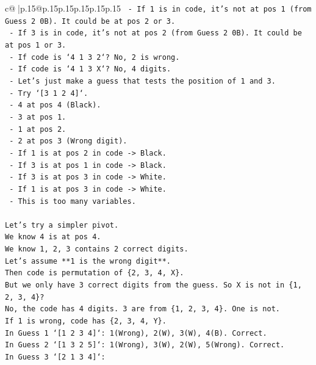 \documentclass{article}
\begin{document}
{\begin{supertabular}{c@{$\;$}|p{.15\linewidth}@{}p{.15\linewidth}p{.15\linewidth}p{.15\linewidth}p{.15\linewidth}p{.15\linewidth}}
{{{\texttt{    {-} If 1 is in code, it's not at pos 1 (from Guess 2 0B). It could be at pos 2 or 3.} \\
\texttt{    {-} If 3 is in code, it's not at pos 2 (from Guess 2 0B). It could be at pos 1 or 3.} \\
\texttt{    {-} If code is `4 1 3 2`? No, 2 is wrong.} \\
\texttt{    {-} If code is `4 1 3 X`? No, 4 digits.} \\
\texttt{    {-} Let's just make a guess that tests the position of 1 and 3.} \\
\texttt{    {-} Try `{[}3 1 2 4{]}`.} \\
\texttt{      {-} 4 at pos 4 (Black).} \\
\texttt{      {-} 3 at pos 1.} \\
\texttt{      {-} 1 at pos 2.} \\
\texttt{      {-} 2 at pos 3 (Wrong digit).} \\
\texttt{      {-} If 1 is at pos 2 in code {-}> Black.} \\
\texttt{      {-} If 3 is at pos 1 in code {-}> Black.} \\
\texttt{      {-} If 3 is at pos 3 in code {-}> White.} \\
\texttt{      {-} If 1 is at pos 3 in code {-}> White.} \\
\texttt{    {-} This is too many variables.} \\
\\ 
\texttt{Let's try a simpler pivot.} \\
\texttt{We know 4 is at pos 4.} \\
\texttt{We know 1, 2, 3 contains 2 correct digits.} \\
\texttt{Let's assume **1 is the wrong digit**.} \\
\texttt{Then code is permutation of \{2, 3, 4, X\}.} \\
\texttt{But we only have 3 correct digits from the guess. So X is not in \{1, 2, 3, 4\}?} \\
\texttt{No, the code has 4 digits. 3 are from \{1, 2, 3, 4\}. One is not.} \\
\texttt{If 1 is wrong, code has \{2, 3, 4, Y\}.} \\
\texttt{In Guess 1 `{[}1 2 3 4{]}`: 1(Wrong), 2(W), 3(W), 4(B). Correct.} \\
\texttt{In Guess 2 `{[}1 3 2 5{]}`: 1(Wrong), 3(W), 2(W), 5(Wrong). Correct.} \\
\texttt{In Guess 3 `{[}2 1 3 4{]}`:} \\
}}}
\end{supertabular}}
\end{document}
